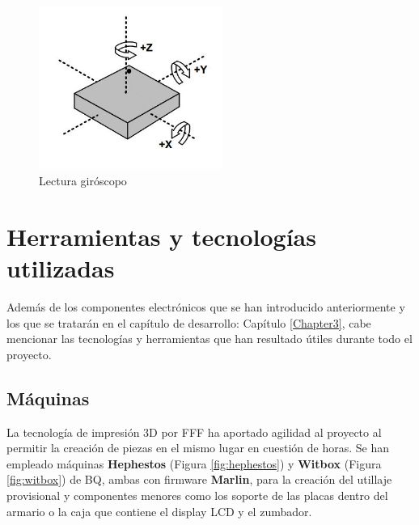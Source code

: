 \begin{figure}[h]
\centering
\includegraphics[width=60mm]{Figures/imus-giro.jpg}
\caption[Lectura giróscopo]{Lectura giróscopo}
\label{fig:ImuGiro}
\end{figure}

\section{Herramientas y tecnologías utilizadas}

Además de los componentes electrónicos que se han introducido anteriormente y los que se tratarán en el capítulo de desarrollo: Capítulo \ref{Chapter3}, cabe mencionar las tecnologías y herramientas que han resultado útiles durante todo el proyecto.

\subsection{Máquinas}

La tecnología de impresión 3D por FFF ha aportado agilidad al proyecto al permitir la creación de piezas en el mismo lugar en cuestión de horas. Se han empleado máquinas \textbf{Hephestos} (Figura \ref{fig:hephestos}) y \textbf{Witbox} (Figura \ref{fig:witbox}) de BQ, ambas con firmware \textbf{Marlin}, para la creación del utillaje provisional y componentes menores como los soporte de las placas dentro del armario o la caja que contiene el display LCD y el zumbador.

